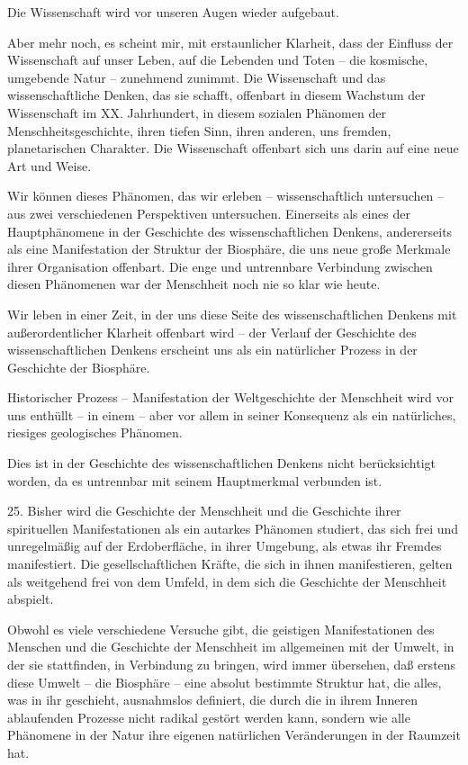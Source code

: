 \documentclass[11pt,a4paper]{book}
\begin{document}
Die Wissenschaft wird vor unseren Augen wieder aufgebaut. 

Aber mehr noch, es scheint mir, mit erstaunlicher Klarheit, dass der Einfluss der Wissenschaft auf unser Leben, auf die Lebenden und Toten -- die kosmische, umgebende Natur -- zunehmend zunimmt. Die Wissenschaft und das wissenschaftliche Denken, das sie schafft, offenbart in diesem Wachstum der Wissenschaft im XX. Jahrhundert, in diesem sozialen Phänomen der Menschheitsgeschichte, ihren tiefen Sinn, ihren anderen, uns fremden, planetarischen Charakter. Die Wissenschaft offenbart sich uns darin auf eine neue Art und Weise. 

Wir können dieses Phänomen, das wir erleben -- wissenschaftlich untersuchen -- aus zwei verschiedenen Perspektiven untersuchen. Einerseits als eines der Hauptphänomene in der Geschichte des wissenschaftlichen Denkens, andererseits als eine Manifestation der Struktur der Biosphäre, die uns neue große Merkmale ihrer Organisation offenbart. Die enge und untrennbare Verbindung zwischen diesen Phänomenen war der Menschheit noch nie so klar wie heute. 

Wir leben in einer Zeit, in der uns diese Seite des wissenschaftlichen Denkens mit außerordentlicher Klarheit offenbart wird -- der Verlauf der Geschichte des wissenschaftlichen Denkens erscheint uns als ein natürlicher Prozess in der Geschichte der Biosphäre. 

Historischer Prozess -- Manifestation der Weltgeschichte der Menschheit wird vor uns enthüllt -- in einem -- aber vor allem in seiner Konsequenz als ein natürliches, riesiges geologisches Phänomen. 

Dies ist in der Geschichte des wissenschaftlichen Denkens nicht berücksichtigt worden, da es untrennbar mit seinem Hauptmerkmal verbunden ist. 

25. Bisher wird die Geschichte der Menschheit und die Geschichte ihrer spirituellen Manifestationen als ein autarkes Phänomen studiert, das sich frei und unregelmäßig auf der Erdoberfläche, in ihrer Umgebung, als etwas ihr Fremdes manifestiert. Die gesellschaftlichen Kräfte, die sich in ihnen manifestieren, gelten als weitgehend frei von dem Umfeld, in dem sich die Geschichte der Menschheit abspielt. 

Obwohl es viele verschiedene Versuche gibt, die geistigen Manifestationen des Menschen und die Geschichte der Menschheit im allgemeinen mit der Umwelt, in der sie stattfinden, in Verbindung zu bringen, wird immer übersehen, daß erstens diese Umwelt -- die Biosphäre -- eine absolut bestimmte Struktur hat, die alles, was in ihr geschieht, ausnahmslos definiert, die durch die in ihrem Inneren ablaufenden Prozesse nicht radikal gestört werden kann, sondern wie alle Phänomene in der Natur ihre eigenen natürlichen Veränderungen in der Raumzeit hat. 
\end{document}
